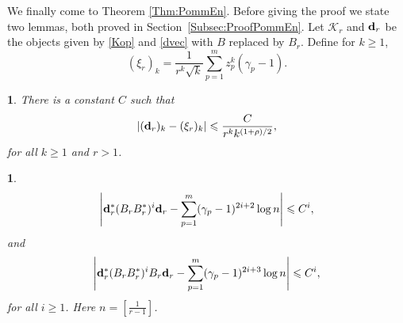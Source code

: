 \documentclass{article}
\numberwithin{equation}{section}
\numberwithin{figure}{section}
\theoremstyle{plain}
\theoremstyle{plain}
\newtheorem{lemma}[thm]{\protect\lemmaname}
\numberwithin{thm}{section}
\theoremstyle{remark}
\providecommand{\lemmaname}{Lemma}
\let \le \leqslant
\let \ge \geqslant
\begin{document}
We finally come to Theorem \ref{Thm:PommEn}. Before giving the proof we state two lemmas, both proved in Section~\ref{Subsec:ProofPommEn}. Let $\mathcal{K}_r$ and ${\bf d}_r$ be the objects given by \eqref{Kop} and \eqref{dvec} with $B$ replaced by $B_r$.
Define for $k\ge 1$,
\begin{equation}\label{xikr}
 (\xi_r)_k=\frac 1{r^k\sqrt{k}}\sum_{p=1}^mz_p^k(\gamma_p-1).
\end{equation}
\begin{lemma}\label{Lem:dapprox}
    There is a constant $C$ such that
    \begin{equation}\label{drxir}
        |({\bf d}_r)_k-(\xi_r)_k|\le\frac{C}{r^kk^{(1+\rho)/2}},
    \end{equation}
    for all $k\ge 1$ and $r>1$.
\end{lemma}
\begin{lemma}\label{Lem:Brdas}
\begin{equation}\label{Brdas1}
   \left|{\bf d}_r^*(B_rB_r^*)^i{\bf d}_r-\sum_{p=1}^m(\gamma_p-1)^{2i+2}\log n\right|\le C^i,  
\end{equation}
and
\begin{equation}\label{Brdas2}
   \left|{\bf d}_r^*(B_rB_r^*)^iB_r{\bf d}_r-\sum_{p=1}^m(\gamma_p-1)^{2i+3}\log n\right|\le C^i,  
\end{equation}
for all $i\ge 1$. Here $n=[\frac 1{r-1}]$.
\end{lemma}
\end{document}
